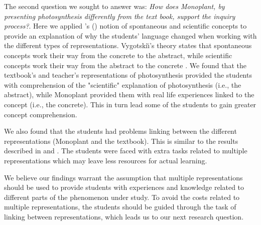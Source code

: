 The second question we sought to answer was: \emph{How does Monoplant, by presenting photosynthesis differently from the text book, support the inquiry process?}. Here we applied \citeauthor{vygotsky2012thought}'s (\citeyear{vygotsky2012thought}) notion of spontaneous and scientific concepts to provide an explanation of why the students' language changed when working with the different types of representations. Vygotski{\u\i}'s theory states that spontaneous concepts work their way from the concrete to the abstract, while scientific concepts work their way from the abstract to the concrete \citep{vygotsky2012thought}. We found that the textbook's and teacher's representations of photosynthesis provided the students with comprehension of the "scientific" explanation of photosynthesis (i.e., the abstract), while Monoplant provided them with real life experiences linked to the concept (i.e., the concrete). This in turn lead some of the students to gain greater concept comprehension. 

We also found that the students had problems linking between the different representations (Monoplant and the textbook). This is similar to the results described in \citet{ainsworth1999functions} and \citet{van2006supporting}. The students were faced with extra tasks related to multiple representations which may leave less resources for actual learning. 

We believe our findings warrant the assumption that multiple representations should be used to provide students with experiences and knowledge related to different parts of the phenomenon under study. To avoid the costs related to multiple representations, the students should be guided through the task of linking between representations, which leads us to our next research question.





